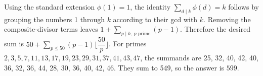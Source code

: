Using the standard extension $\phi(1)=1$, the identity $\sum_{d\mid k}\phi(d)=k$ follows by grouping the numbers 1 through $k$ according to their gcd with $k$. Removing the composite-divisor terms leaves $1+\sum_{p\mid k,\ p\text{ prime}}(p-1)$. Therefore the desired sum is $50+\sum_{p\le50}(p-1)\lfloor\dfrac{50}{p}\rfloor$. For primes $2,3,5,7,11,13,17,19,23,29,31,37,41,43,47$, the summands are 25, 32, 40, 42, 40, 36, 32, 36, 44, 28, 30, 36, 40, 42, 46. They sum to 549, so the answer is $\boxed{599}$.

